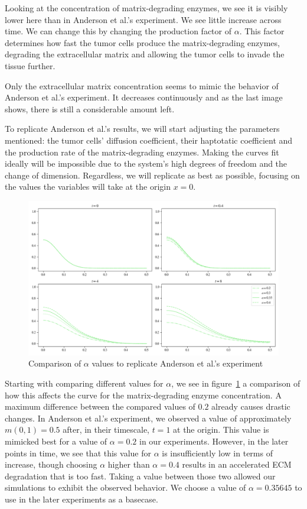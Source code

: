 Looking at the concentration of matrix-degrading enzymes, we see it is visibly lower here than in Anderson et al.'s experiment. We see little increase across time. We can change this by changing the production factor of $\alpha$. This factor determines how fast the tumor cells produce the matrix-degrading enzymes, degrading the extracellular matrix and allowing the tumor cells to invade the tissue further.

Only the extracellular matrix concentration seems to mimic the behavior of Anderson et al.'s experiment. It decreases continuously and as the last image shows, there is still a considerable amount left.

To replicate Anderson et al.'s results, we will start adjusting the parameters mentioned: the tumor cells' diffusion coefficient, their haptotatic coefficient and the production rate of the matrix-degrading enzymes. Making the curves fit ideally will be impossible due to the system's high degrees of freedom and the change of dimension. Regardless, we will replicate as best as possible, focusing on the values the variables will take at the origin $x=0$.

\begin{figure}[!htb]
 \centering
 \includegraphics[width=\textwidth]{resources/images/alpha_comparison.png}
 \caption{Comparison of $\alpha$ values to replicate Anderson et al.'s experiment}
 \label{fig:replication_alpha_comparison}
\end{figure}
Starting with comparing different values for $\alpha$, we see in figure~\ref{fig:replication_alpha_comparison} a comparison of how this affects the curve for the matrix-degrading enzyme concentration. A maximum difference between the compared values of $0.2$ already causes drastic changes. In Anderson et al.'s experiment, we observed a value of approximately $m(0,1)=0.5$ after, in their timescale, $t=1$ at the origin. This value is mimicked best for a value of $\alpha=0.2$ in our experiments. However, in the later points in time, we see that this value for $\alpha$ is insufficiently low in terms of increase, though choosing $\alpha$ higher than $\alpha=0.4$ results in an accelerated ECM degradation that is too fast. Taking a value between those two allowed our simulations to exhibit the observed behavior. We choose a value of $\alpha=0.35645$ to use in the later experiments as a basecase.

